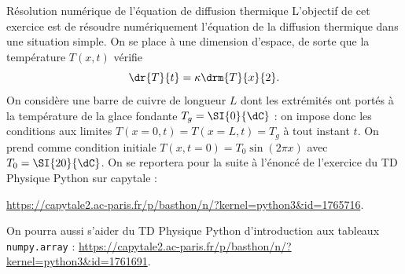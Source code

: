 \begin{exo}[PC][3][python]{Résolution numérique de l’équation de diffusion thermique}
L’objectif de cet exercice est de résoudre numériquement l’équation de la diffusion thermique dans une situation simple. On se place à une dimension d’espace, de sorte que la température $T(x,t)$ vérifie
\begin{equation}\label{eq:diffu_python}
\dr{T}{t} = \kappa \drm{T}{x}{2}.
\end{equation}
On considère une barre de cuivre de longueur $L$ dont les extrémités ont portés à la température de la glace fondante $T_g = \SI{0}{\dC}$ : on impose donc les conditions aux limites $T(x=0,t) = T(x=L,t) = T_g$ à tout instant $t$. On prend comme condition initiale $T(x,t=0) = T_0 \sin(2\pi x)$ avec $T_0 = \SI{20}{\dC}$.
On se reportera pour la suite à l'énoncé de l'exercice du TD Physique Python sur capytale :
\begin{center}
  \url{https://capytale2.ac-paris.fr/p/basthon/n/?kernel=python3&id=1765716}.
\end{center}
\begin{remarque}
  On pourra aussi s'aider du TD Physique Python d'introduction aux tableaux \texttt{numpy.array} : \url{https://capytale2.ac-paris.fr/p/basthon/n/?kernel=python3&id=1761691}.
\end{remarque}


\end{exo}
